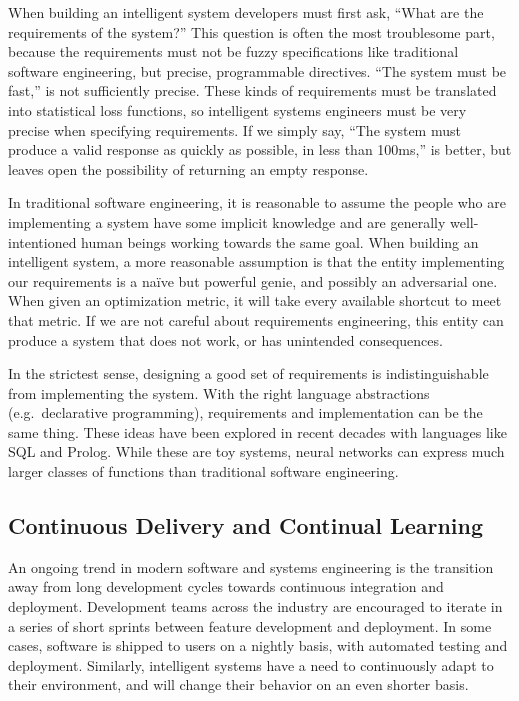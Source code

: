 \documentclass[12pt,initial,twoside,maitrise]{dms}
\numberwithin{equation}{section}
\numberwithin{table}{chapter}
\numberwithin{figure}{chapter}
\begin{document}
When building an intelligent system developers must first ask, ``What are the requirements of the system?'' This question is often the most troublesome part, because the requirements must not be fuzzy specifications like traditional software engineering, but precise, programmable directives. ``The system must be fast,'' is not sufficiently precise. These kinds of requirements must be translated into statistical loss functions, so intelligent systems engineers must be very precise when specifying requirements. If we simply say, ``The system must produce a valid response as quickly as possible, in less than 100ms,'' is better, but leaves open the possibility of returning an empty response.

In traditional software engineering, it is reasonable to assume the people who are implementing a system have some implicit knowledge and are generally well-intentioned human beings working towards the same goal. When building an intelligent system, a more reasonable assumption is that the entity implementing our requirements is a na\"ive but powerful genie, and possibly an adversarial one. When given an optimization metric, it will take every available shortcut to meet that metric. If we are not careful about requirements engineering, this entity can produce a system that does not work, or has unintended consequences.

In the strictest sense, designing a good set of requirements is indistinguishable from implementing the system. With the right language abstractions (e.g.\ declarative programming), requirements and implementation can be the same thing. These ideas have been explored in recent decades with languages like SQL and Prolog. While these are toy systems, neural networks can express much larger classes of functions than traditional software engineering.

\subsection{Continuous Delivery and Continual Learning}

An ongoing trend in modern software and systems engineering is the transition away from long development cycles towards continuous integration and deployment. Development teams across the industry are encouraged to iterate in a series of short sprints between feature development and deployment. In some cases, software is shipped to users on a nightly basis, with automated testing and deployment. Similarly, intelligent systems have a need to continuously adapt to their environment, and will change their behavior on an even shorter basis.
\end{document}
